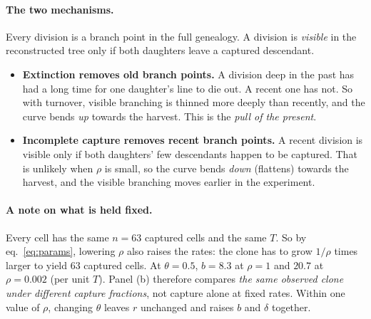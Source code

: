 \documentclass[11pt]{article}
\newcommand{\bdrate}{b}          %
\newcommand{\dthrate}{\delta}    %
\newcommand{\turn}{\theta}       %
\newcommand{\net}{r}             %
\newcommand{\capt}{\rho}         %
\begin{document}
\paragraph{The two mechanisms.} Every division is a branch point in the full genealogy. A division
is \emph{visible} in the reconstructed tree only if both daughters leave a captured descendant.
\begin{itemize}
  \item \textbf{Extinction removes old branch points.} A division deep in the past has had a long
        time for one daughter's line to die out. A recent one has not. So with turnover, visible
        branching is thinned more deeply than recently, and the curve bends \emph{up} towards the
        harvest. This is the \emph{pull of the present}.
  \item \textbf{Incomplete capture removes recent branch points.} A recent division is visible only
        if both daughters' few descendants happen to be captured. That is unlikely when $\capt$ is
        small, so the curve bends \emph{down} (flattens) towards the harvest, and the visible
        branching moves earlier in the experiment.
\end{itemize}

\paragraph{A note on what is held fixed.} Every cell has the same $n=63$ captured cells and the
same $T$. So by eq.~\eqref{eq:params}, lowering $\capt$ also raises the rates: the clone has to
grow $1/\capt$ times larger to yield 63 captured cells. At $\turn=0.5$, $\bdrate=8.3$ at $\capt=1$
and $20.7$ at $\capt=0.002$ (per unit $T$). Panel (b) therefore compares \emph{the same observed
clone under different capture fractions}, not capture alone at fixed rates. Within one value of
$\capt$, changing $\turn$ leaves $\net$ unchanged and raises $\bdrate$ and $\dthrate$ together.
\end{document}
